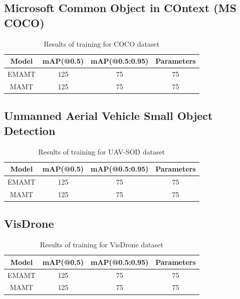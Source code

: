 \subsection{Microsoft Common Object in COntext (MS COCO)}

\begin{table}[h]
    \centering
    \begin{tabular}{|c|c|c|c|}
        \hline
        \textbf{Model}     & \textbf{mAP(@0.5)}     & \textbf{mAP(@0.5:0.95)}  & \textbf{Parameters}   \\ \hline
        EMAMT              & 125                    & 75                       & 75                    \\ \hline
        MAMT               & 125                    & 75                       & 75                    \\ \hline
    \end{tabular}
    \caption{Results of training for COCO dataset}
    \label{tab:coco_results}
\end{table}



\subsection{Unmanned Aerial Vehicle Small Object Detection}
\begin{table}[h]
    \centering
    \begin{tabular}{|c|c|c|c|}
        \hline
        \textbf{Model}     & \textbf{mAP(@0.5)}     & \textbf{mAP(@0.5:0.95)}  & \textbf{Parameters}   \\ \hline
        EMAMT              & 125                    & 75                       & 75                    \\ \hline
        MAMT               & 125                    & 75                       & 75                    \\ \hline    
    \end{tabular}
    \caption{Results of training for UAV-SOD dataset}
    \label{tab:uav_results}
\end{table}





\subsection{VisDrone}
\begin{table}[h]
    \centering
    \begin{tabular}{|c|c|c|c|}
        \hline
        \textbf{Model}     & \textbf{mAP(@0.5)}     & \textbf{mAP(@0.5:0.95)}  & \textbf{Parameters}   \\ \hline
        EMAMT              & 125                    & 75                       & 75                    \\ \hline
        MAMT               & 125                    & 75                       & 75                    \\ \hline
    \end{tabular}
    \caption{Results of training for VisDrone dataset}
    \label{tab:vis_results}
\end{table}